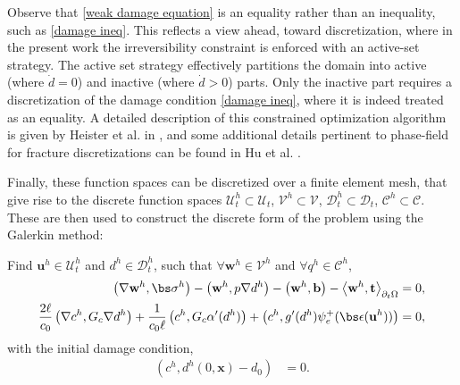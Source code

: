 Observe that \eqref{weak damage equation} is an equality rather than an inequality, such as \eqref{damage ineq}.  This reflects a view ahead, toward discretization, where in the present work  the irreversibility constraint is enforced with an active-set strategy.  The active set strategy effectively partitions the domain into active (where $\dot{d}=0$) and inactive (where $\dot{d}>0$) parts. Only the inactive part requires a discretization of the damage condition \eqref{damage ineq}, where it is indeed treated as an equality. A detailed description of this constrained optimization algorithm is given by Heister et al. in \cite{heister2015primal}, and some additional details pertinent to phase-field for fracture discretizations can be found in Hu et al. \cite{hu2020phase}.

Finally, these function spaces can be discretized over a finite element mesh, that give rise to the discrete function spaces $\boldsymbol{\mathcal{U}}^h_t \subset \boldsymbol{\mathcal{U}}_t$, $\boldsymbol{\mathcal{V}}^h \subset \boldsymbol{\mathcal{V}}$, $\mathcal{D}^h_t \subset \mathcal{D}_t$, $\mathcal{C}^h \subset \mathcal{C}$. These are then used to construct the discrete form of the problem using the Galerkin method:

\begin{mdframed}[
    frametitle={Spatially discretized form},
    frametitlebackgroundcolor=gray!20,
    backgroundcolor=gray!5,
    linewidth=0pt,
    nobreak=true
  ]
  Find $\textbf{u}^h \in \boldsymbol{\mathcal{U}}^h_t$ and $d^h \in \mathcal{D}^h_t$, such that $\forall \textbf{w}^h \in \boldsymbol{\mathcal{V}}^h$ and $\forall q^h \in \mathcal{C}^h$,
  \begin{subequations}
    \begin{align}
      \left( \nabla \textbf{w}^h, \bs\sigma^h \right) - \left( \textbf{w}^h, p\nabla d^h \right) - \left( \textbf{w}^h, \textbf{b} \right) - \left< \textbf{w}^h, \textbf{t} \right>_{\partial_t\Omega} & = 0, \label{eq: semidiscrete momentum balance ch2}   \\
      \frac{2\ell}{c_0}\left( \nabla c^h, G_c\nabla d^h \right) + \frac{1}{c_0\ell}\left( c^h, G_c\alpha'(d^h) \right) + \left( c^h, g'(d^h)\psi_e^+ (\bs\epsilon(\textbf{u}^h)) \right) & = 0, \label{eq: semidiscrete fracture evolution}
    \end{align}
  \end{subequations}
  with the initial damage condition,
  \begin{subequations}
    \begin{align}
      \left( c^h, d^h(0,\textbf{x}) - d_0 \right)                & = 0.
    \end{align}
  \end{subequations}
\end{mdframed}


